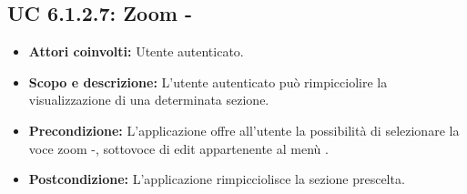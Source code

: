 \subsection{UC 6.1.2.7: Zoom -}
\begin{itemize}
		\item \textbf{Attori coinvolti:} Utente autenticato. \\
		\item \textbf{Scopo e descrizione:} L'utente autenticato può rimpicciolire la visualizzazione di una determinata sezione. \\
		\item \textbf{Precondizione:} L'applicazione offre all'utente la possibilità di selezionare la voce zoom -, sottovoce di edit appartenente al menù . \\
		\item \textbf{Postcondizione:} L'applicazione rimpicciolisce la sezione prescelta. \\
\end{itemize}